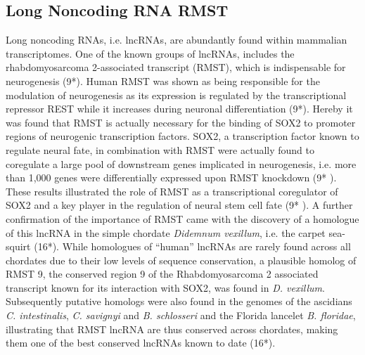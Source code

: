 \documentclass[graybox]{svmult}
\begin{document}
\subsection{Long Noncoding RNA RMST}
Long noncoding RNAs, i.e. lncRNAs, are abundantly found within mammalian 
transcriptomes. One of the known groups of lncRNAs, includes the 
rhabdomyosarcoma 2-associated transcript (RMST), which is indispensable for 
neurogenesis (9*). 
Human RMST was shown as being responsible for the modulation of neurogenesis as 
its expression is regulated by the transcriptional repressor REST while it 
increases during neuronal differentiation (9*). Hereby it was found that RMST is 
actually necessary for the binding of SOX2 to promoter regions of neurogenic 
transcription factors. SOX2, a transcription factor known to regulate neural 
fate, in combination with RMST were actually found to coregulate a large pool of 
downstream genes implicated in neurogenesis, i.e. more than 1,000 genes were 
differentially expressed upon RMST knockdown (9* ). These results illustrated 
the role of RMST as a transcriptional coregulator of SOX2 and a key player in 
the regulation of neural stem cell fate (9* ).
A further confirmation of the importance of RMST came with the discovery of a 
homologue of this lncRNA in the simple chordate \textit{Didemnum vexillum}, 
i.e. the carpet sea-squirt (16*). While homologues of ``human'' lncRNAs are 
rarely found across all chordates due to their low levels of sequence 
conservation, a plausible homolog of RMST 9, the conserved region 9 of the 
Rhabdomyosarcoma 2 associated transcript known for its interaction with SOX2, 
was found in \textit{D. vexillum}. Subsequently putative homologs were also 
found in the genomes of the ascidians \textit{C. intestinalis}, \textit{C. 
savignyi} and \textit{B. schlosseri} and the Florida lancelet \textit{B. 
floridae}, illustrating that RMST lncRNA are thus conserved across chordates, 
making them one of the best conserved lncRNAs known to date (16*).
\end{document}
